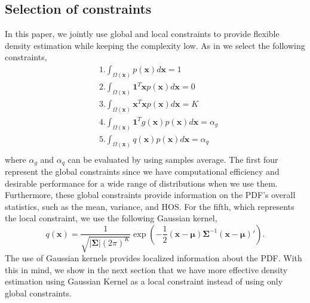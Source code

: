 \documentclass[conference]{IEEEtran}
\begin{document}
\subsection{Selection of constraints} 
In this paper, we jointly use global and local constraints to provide flexible density estimation while keeping the complexity low. As in \cite{Zois:2015} we select the following constraints,
\begin{equation} 
\begin{split}
& 1. \int_{\Omega(\mathbf{x})}  p(\mathbf{x}) d \mathbf{x} = 1 \\
& 2. \int_{\Omega(\mathbf{x})} \mathbf{1}^{T} \mathbf{x} p(\mathbf{x}) d \mathbf{x} = 0 \\
& 3. \int_{\Omega(\mathbf{x})} \mathbf{x}^{T} \mathbf{x} p(\mathbf{x}) d \mathbf{x} = K \\
& 4. \int_{\Omega(\mathbf{x})} \mathbf{1}^{T} g(\mathbf{x}) p(\mathbf{x}) d \mathbf{x} = \alpha_g \\
& 5. \int_{\Omega(\mathbf{x})} q(\mathbf{x}) p(\mathbf{x}) d \mathbf{x} = \alpha_q \\
\end{split}
\end{equation}
where $\alpha_g$ and $\alpha_q$  can be evaluated by using samples average. The first four represent the global constraints since we have computational efficiency and desirable performance for a wide range of distributions when we use them. Furthermore, these global constraints provide information on the PDF's overall statistics, such as the mean, variance, and HOS. For the fifth, which represents the local constraint, we use the following Gaussian kernel,
\begin{equation}
 q(\mathbf{x})=\frac{1}{\sqrt{|\boldsymbol{\Sigma}|(2\pi)^{K}}} \exp{(-\frac{1}{2}(\mathbf{x}-\boldsymbol{\mu})\boldsymbol{\Sigma}^{-1}(\mathbf{x}-\boldsymbol{\mu})')}. 
\end{equation}
%
The use of Gaussian kernels provides localized information about the PDF. With this in mind, we show in the next section that we have more effective density estimation using Gaussian Kernel as a local constraint instead of using only global constraints.
%
\end{document}
